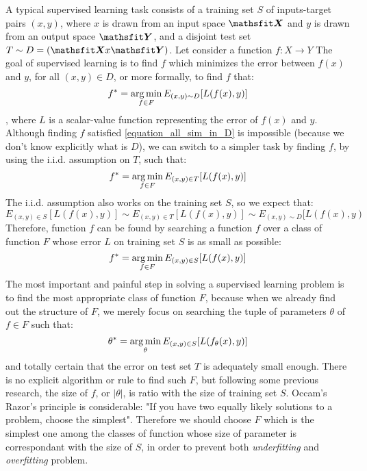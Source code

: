 A typical supervised learning task consists of a training set $\displaystyle S$ of inputs-target pairs $\displaystyle (x, y)$, where $\displaystyle x$ is drawn from an input space $\displaystyle \tX$ and $\displaystyle y$ is drawn from an output space $\displaystyle \tY$, and a disjoint test set $\displaystyle T \sim D = (\tX x \tY)$. Let consider a function $\displaystyle f : X \rightarrow Y$ The goal of supervised learning is to find $\displaystyle f$ which minimizes the error between $\displaystyle f(x)$ and $\displaystyle y$, for all $\displaystyle (x,y) \in D$, or more formally, to find $\displaystyle f$ that:
\[ f^* = \operatorname*{arg\,min}_{f \in F} E_{(x,y) \sim D}[L(f(x),y)] \label{equation_all_sim_in_D} \],
where $\displaystyle L$ is a scalar-value function representing the error of $\displaystyle f(x)$ and $\displaystyle y$. Although finding $\displaystyle f$ satisfied \eqref{equation_all_sim_in_D} is impossible (because we don't know explicitly what is $\displaystyle D$), we can switch to a simpler task by finding $\displaystyle f$, by using the i.i.d. assumption on $\displaystyle T$, such that:
\[ f^* = \operatorname*{arg\,min}_{f \in F} E_{(x,y) \in T}[L(f(x), y)]\]
The i.i.d. assumption also works on the training set $\displaystyle S$, so we expect that:
\[ E_{(x,y) \in S}[L(f(x), y)] \sim E_{(x,y) \in T}[L(f(x), y)] \sim E_{(x,y) \sim D}[L(f(x),y) \]
Therefore, function $\displaystyle f$ can be found by searching a function $\displaystyle f$ over a class of function $\displaystyle F$ whose error $\displaystyle L$ on training set $\displaystyle S$ is as small as possible:
\[ f^* = \operatorname*{arg\,min}_{f \in F} E_{(x,y) \in S}[L(f(x), y)] \]
The most important and painful step in solving a supervised learning problem is to find the most appropriate class of function $\displaystyle F$, because when we already find out the structure of $\displaystyle F$, we merely focus on searching the tuple of parameters $\displaystyle \theta$ of $\displaystyle f \in F$ such that:
\[ {\theta}^{*} = \operatorname*{arg\,min}_{\theta}E_{(x,y) \in S}[L(f_{\theta}(x), y)] \label{equation_loss_in_train_set_of_f_theta} \]
and totally certain that the error on test set $\displaystyle T$ is adequately small enough. There is no explicit algorithm or rule to find such $\displaystyle F$, but following some previous research, %
the size of $\displaystyle f$, or $|\theta|$, is ratio with the size of training set $\displaystyle S$. Occam's Razor's principle is considerable: "If you have two equally likely solutions to a problem, choose the simplest". Therefore we should choose $\displaystyle F$ which is the simplest one among the classes of function whose size of parameter is correspondant with the size of $\displaystyle S$, in order to prevent both \textit{underfitting} and \textit{overfitting} problem.


